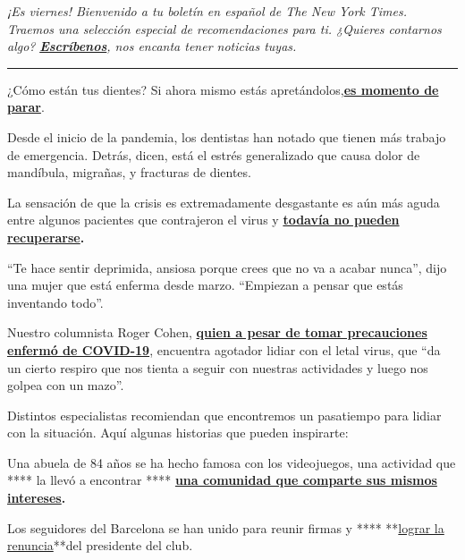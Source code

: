 \emph{¡Es viernes! Bienvenido a tu boletín en español de The New York
Times. Traemos una selección especial de recomendaciones para ti.
¿Quieres contarnos algo?}
\textbf{\href{mailto:comentarios@NYTimes.com}{\emph{Escríbenos}}}\emph{,
nos encanta tener noticias tuyas.}

\begin{center}\rule{0.5\linewidth}{\linethickness}\end{center}

¿Cómo están tus dientes? Si ahora mismo estás
apretándolos,\textbf{\href{https://www.nytimes3xbfgragh.onion/es/2020/09/08/espanol/ciencia-y-tecnologia/dentistas-covid-dientes.html}{es
momento de parar}}.

Desde el inicio de la pandemia, los dentistas han notado que tienen más
trabajo de emergencia. Detrás, dicen, está el estrés generalizado que
causa dolor de mandíbula, migrañas, y fracturas de dientes.

La sensación de que la crisis es extremadamente desgastante es aún más
aguda entre algunos pacientes que contrajeron el virus y
\textbf{\href{https://www.nytimes3xbfgragh.onion/es/2020/09/09/espanol/ciencia-y-tecnologia/salud-mental-coronavirus.html}{todavía
no pueden recuperarse}.}

``Te hace sentir deprimida, ansiosa porque crees que no va a acabar
nunca'', dijo una mujer que está enferma desde marzo. ``Empiezan a
pensar que estás inventando todo''.

Nuestro columnista Roger Cohen,
\textbf{\href{https://www.nytimes3xbfgragh.onion/es/2020/09/07/espanol/opinion/coronavirus-donald-trump.html}{quien
a pesar de tomar precauciones enfermó de COVID-19}}, encuentra agotador
lidiar con el letal virus, que ``da un cierto respiro que nos tienta a
seguir con nuestras actividades y luego nos golpea con un mazo''.

Distintos especialistas recomiendan que encontremos un pasatiempo para
lidiar con la situación. Aquí algunas historias que pueden inspirarte:

Una abuela de 84 años se ha hecho famosa con los videojuegos, una
actividad que **** la llevó a encontrar ****
\textbf{\href{https://www.nytimes3xbfgragh.onion/es/2020/09/04/espanol/estilos-de-vida/la-abuela-videojugadora-que-tiene-mas-de-900-000-nietos.html}{una
comunidad que comparte sus mismos intereses}.}

Los seguidores del Barcelona se han unido para reunir firmas y ****
**\href{https://www.nytimes3xbfgragh.onion/es/2020/09/10/espanol/deportes/barcelona-bartomeu.html}{lograr
la renuncia}**del presidente del club.

